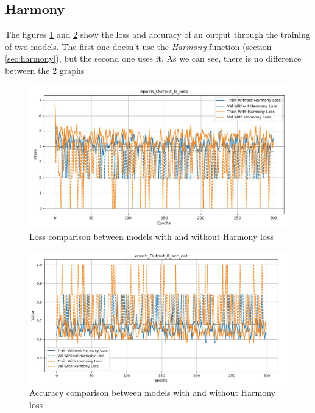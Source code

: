 \documentclass[12pt]{report}
\begin{document}
\subsection{Harmony}

The figures \ref{fig:loss-comparison-harmony} and \ref{fig:acc-comparison-harmony} show the loss and accuracy of an output through the training of two models.
The first one doesn't use the \textit{Harmony} function (section \ref{sec:harmony}), but the second one uses it.
As we can see, there is no difference between the 2 graphs

\begin{figure}[ht]
    \centering
    \includegraphics[width=\textwidth]{images/experiences/harmony/loss-comparison-harmony.jpg}
    \caption{Loss comparison between models with and without Harmony loss}
    \label{fig:loss-comparison-harmony}
\end{figure}

\begin{figure}[ht]
    \centering
    \includegraphics[width=\textwidth]{images/experiences/harmony/acc-comparison-harmony.jpg}
    \caption{Accuracy comparison between models with and without Harmony loss}
    \label{fig:acc-comparison-harmony}
\end{figure}
\end{document}
